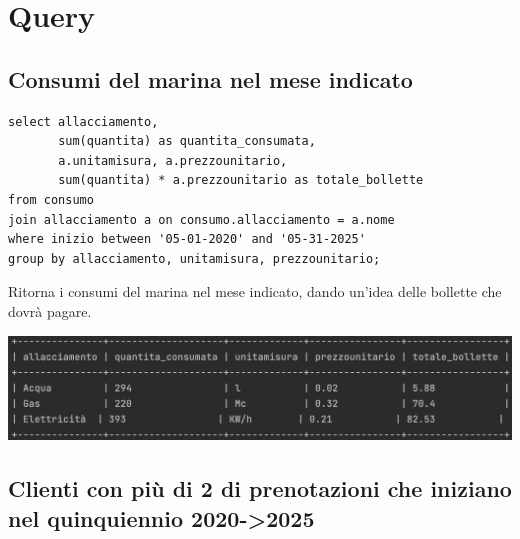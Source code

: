 


\section{Query}

\subsection{Consumi del marina nel mese indicato}
\begin{lstlisting}
select allacciamento,
       sum(quantita) as quantita_consumata,
       a.unitamisura, a.prezzounitario,
       sum(quantita) * a.prezzounitario as totale_bollette
from consumo
join allacciamento a on consumo.allacciamento = a.nome
where inizio between '05-01-2020' and '05-31-2025'
group by allacciamento, unitamisura, prezzounitario;

\end{lstlisting}

Ritorna i consumi del marina nel mese indicato, dando un'idea delle bollette che dovrà pagare.\\
\begin{center}
    \includegraphics[width=\linewidth]{img/result_consumi.png}
\end{center}


\subsection{Clienti con più di 2 di prenotazioni che iniziano nel quinquiennio 2020->2025}


